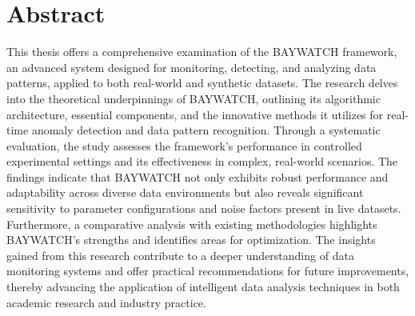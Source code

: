 \documentclass[a4paper]{scrbook}
\begin{document}
\pagestyle{headings}




\chapter*{Abstract}

This thesis offers a comprehensive examination of the BAYWATCH framework, an advanced system designed for monitoring, detecting, and analyzing data patterns, applied to both real-world and synthetic datasets. The research delves into the theoretical underpinnings of BAYWATCH, outlining its algorithmic architecture, essential components, and the innovative methods it utilizes for real-time anomaly detection and data pattern recognition. Through a systematic evaluation, the study assesses the framework’s performance in controlled experimental settings and its effectiveness in complex, real-world scenarios. The findings indicate that BAYWATCH not only exhibits robust performance and adaptability across diverse data environments but also reveals significant sensitivity to parameter configurations and noise factors present in live datasets. Furthermore, a comparative analysis with existing methodologies highlights BAYWATCH’s strengths and identifies areas for optimization. The insights gained from this research contribute to a deeper understanding of data monitoring systems and offer practical recommendations for future improvements, thereby advancing the application of intelligent data analysis techniques in both academic research and industry practice.


\tableofcontents

\cleardoublepage%
\setcounter{page}{1}




\end{document}
